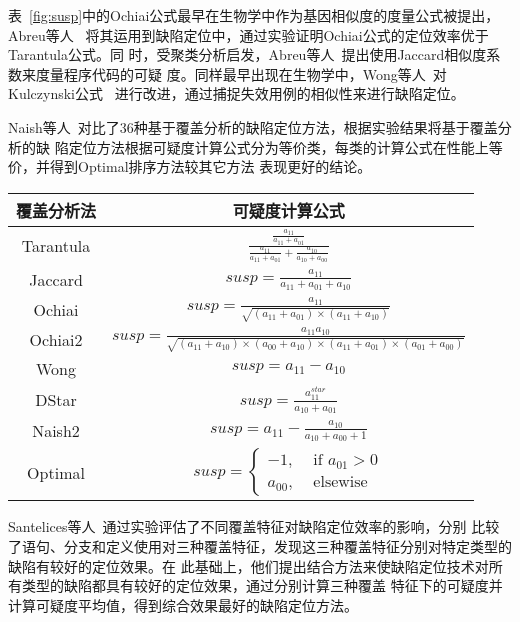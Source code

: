 表~\ref{fig:susp}中的Ochiai公式最早在生物学中作为基因相似度的度量公式被提出，Abreu等人
~\cite{abreu2007accuracy}将其运用到缺陷定位中，通过实验证明Ochiai公式的定位效率优于Tarantula公式。同
时，受聚类分析启发，Abreu等人~\cite{abreu2007accuracy}提出使用Jaccard相似度系数来度量程序代码的可疑
度。同样最早出现在生物学中，Wong等人~\cite{wong2014dstar}对Kulczynski公式
~\cite{willett2003similarity}进行改进，通过捕捉失效用例的相似性来进行缺陷定位。

Naish等人~\cite{naish2011model}对比了36种基于覆盖分析的缺陷定位方法，根据实验结果将基于覆盖分析的缺
陷定位方法根据可疑度计算公式分为等价类，每类的计算公式在性能上等价，并得到Optimal排序方法较其它方法
表现更好的结论。

\begin{center}
  \scriptsize
{}\label{fig:susp}
\begin{tabular}{c|c}
\toprule
覆盖分析法 & 可疑度计算公式 \\ \hline
Tarantula & $\frac{\frac{a_{11}}{a_{11}+a_{01}}}{\frac{a_{11}}{a_{11}+a_{01}}+\frac{a_{10}}{a_{10}+a_{00}}}$\\ 
Jaccard & $susp = \frac{a_{11}}{a_{11}+a_{01}+a_{10}}$\\ 
Ochiai & $susp = \frac{a_{11}}{\sqrt{(a_{11}+a_{01})\times(a_{11}+a_{10})}}$\\
Ochiai2 & $susp = \frac{a_{11}a_{10}}{\sqrt{(a_{11}+a_{10})\times (a_{00}+a_{10})\times (a_{11}+a_{01})\times (a_{01}+a_{00})}}$\\ 
Wong & $susp = a_{11}-a_{10}$\\
DStar & $susp = \frac{a_{11}^{star}}{a_{10}+a_{01}}$\\ 
Naish2 & $susp = a_{11}-\frac{a_{10}}{a_{10}+a_{00}+1}$ \\
Optimal & $susp = \begin{cases}
  -1, & \text{ if } a_{01}>0 \\ 
  a_{00}, & \text{ elsewise }  
  \end{cases}$\\ 
  \bottomrule
\end{tabular}
\end{center}

Santelices等人~\cite{santelices2009lightweight}通过实验评估了不同覆盖特征对缺陷定位效率的影响，分别
比较了语句、分支和定义使用对三种覆盖特征，发现这三种覆盖特征分别对特定类型的缺陷有较好的定位效果。在
此基础上，他们提出结合方法来使缺陷定位技术对所有类型的缺陷都具有较好的定位效果，通过分别计算三种覆盖
特征下的可疑度并计算可疑度平均值，得到综合效果最好的缺陷定位方法。

